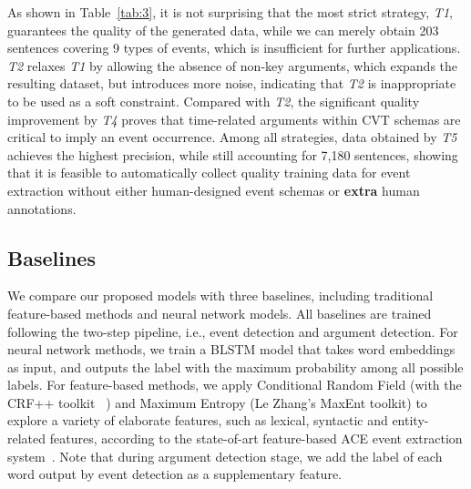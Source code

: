 As shown in Table~\ref{tab:3}, it is not surprising that the most strict strategy, \emph{T1}, guarantees the quality of the generated data, while we can merely obtain 203 sentences covering 9 types of events, which is insufficient for further applications. \emph{T2} relaxes \emph{T1} by allowing the absence of non-key arguments, which expands the resulting dataset, but introduces more noise, indicating that \emph{T2} is inappropriate to be used as a soft constraint. Compared with \emph{T2}, the significant quality improvement by \emph{T4} proves that time-related arguments within CVT schemas are critical to imply an event occurrence. Among all strategies, data obtained by \emph{T5} achieves the highest precision, while still accounting for 7,180 sentences, showing that it is feasible to automatically collect quality training data for event extraction without either human-designed event schemas or \textbf{extra} human annotations.     

\subsection{Baselines}
We compare our proposed models with three baselines, including traditional feature-based methods and neural network models. All baselines are trained following the two-step pipeline, i.e., event detection and argument detection.
For neural network methods, we train a  BLSTM model that takes word embeddings as input, and outputs the label with the maximum probability among all possible labels. 
For feature-based methods, we apply Conditional Random Field \cite{lafferty2001conditional} (with the CRF++ toolkit~\cite{kudo2005crf++} ) and Maximum Entropy \cite{berger1996maximum} (Le Zhang's MaxEnt toolkit) to explore a variety of elaborate features, such as lexical, syntactic and entity-related features, according to the state-of-art feature-based ACE event extraction system~\cite{li2013joint}. Note that during argument detection stage, we add the label of each word output by event detection as a supplementary feature.


